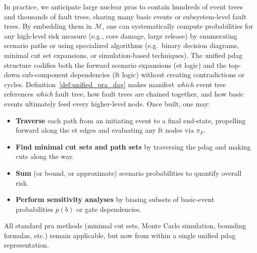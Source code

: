 In practice, we anticipate large nuclear \acrshort{pra}s to contain hundreds of event trees and thousands of fault trees, sharing many basic events or subsystem-level fault trees.  By embedding them in \(\mathcal{M}\), one can systematically compute probabilities for any high-level risk measure (e.g., core damage, large release) by enumerating scenario paths or using specialized algorithms (e.g.\ binary decision diagrams, minimal cut set expansions, or simulation-based techniques).  The unified \acrshort{pdag} structure codifies both the forward scenario expansions (\acrshort{et} logic) and the top-down sub-component dependencies (\acrshort{ft} logic) without creating contradictions or cycles. Definition~\ref{def:unified_pra_dag} makes manifest \emph{which} event tree references \emph{which} fault tree, how fault trees are chained together, and how basic events ultimately feed every higher-level node.  Once built, one may:
\begin{itemize}
\item \textbf{Traverse} each path from an initiating event to a final end-state, propelling forward along the \acrshort{et} edges and evaluating any \acrshort{ft} nodes via \(\pi_{F}\).
\item \textbf{Find minimal cut sets and path sets} by traversing the \acrshort{pdag} and making cuts along the way.
\item \textbf{Sum} (or bound, or approximate) scenario probabilities to quantify overall risk.  
\item \textbf{Perform sensitivity analyses} by biasing subsets of basic-event probabilities \(p(b)\) or gate dependencies.
\end{itemize}
All standard \acrshort{pra} methods (minimal cut sets, Monte Carlo simulation, bounding formulas, etc.) remain applicable, but now from within a single unified \acrshort{pdag} representation.